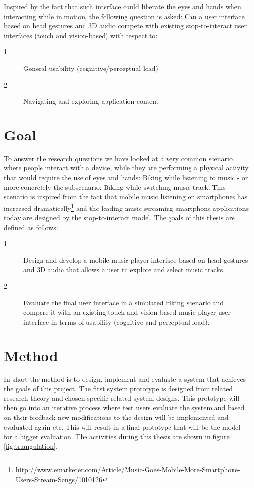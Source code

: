 Inspired by the fact that such interface could liberate the eyes and hands when interacting while in motion, the following question is asked: Can a user interface based on head gestures and 3D audio compete with existing stop-to-interact user interfaces (touch and vision-based) with respect to:

\begin{description}
\item[1] General usability (cognitive/perceptual load)
\item[2] Navigating and exploring application content
\end{description}


\section{Goal}
To answer the research questions we have looked at a very common scenario where people interact with a device, while they are performing a physical activity that would require the use of eyes and hands: Biking while listening to music - or more concretely the subscenario: Biking while switching music track. This scenario is inspired from the fact that mobile music listening on smartphones has increased dramatically\footnote{\url{http://www.emarketer.com/Article/Music-Goes-Mobile-More-Smartphone-Users-Stream-Songs/1010126}} and the leading music streaming smartphone applications today are designed by the stop-to-interact model. The goals of this thesis are defined as follows:

\begin{description}
\item[1] Design and develop a mobile music player interface based on head gestures and 3D audio that allows a user to explore and select music tracks.
\item[2] Evaluate the final user interface in a simulated biking scenario and compare it with an existing touch and vision-based music player user interface in terms of usability (cognitive and perceptual load).
\end{description}


\section{Method}
In short the method is to design, implement and evaluate a system that achieves the goals of this project. The first system prototype is designed from related research theory and chosen specific related system designs. This prototype will then go into an iterative process where test users evaluate the system and based on their feedback new modifications to the design will be implemented and evaluated again etc. This will result in a final prototype that will be the model for a bigger evaluation. The activities during this thesis are shown in figure \ref{fig:triangulation}.


